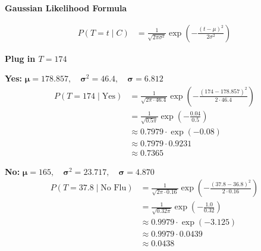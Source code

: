\documentclass[a4paper,12pt]{article}
\begin{document}
\vspace{1cm}

\textbf{Gaussian Likelihood Formula}

\begin{align*}
P(T = t \mid C) &= \frac{1}{\sqrt{2\pi\sigma^2}} \exp\left( -\frac{(t - \mu)^2}{2\sigma^2} \right)
\end{align*}

\textbf{Plug in $T = 174$}

\vspace{1cm}

\textbf{Yes: } $\bm{\mu} = 178.857, \quad \bm{\sigma}^2 = 46.4, \quad \bm{\sigma} = 6.812$
\begin{align*}
P(T = 174 \mid \text{Yes}) &= \frac{1}{\sqrt{2\pi \cdot 46.4}} \exp\left( -\frac{(174 - 178.857)^2}{2 \cdot 46.4} \right) \\
&= \frac{1}{\sqrt{0.5\pi}} \exp\left( -\frac{0.04}{0.5} \right) \\
&\approx 0.7979 \cdot \exp(-0.08) \\
&\approx 0.7979 \cdot 0.9231 \\
&\approx 0.7365
\end{align*}

\textbf{No: } $\bm{\mu} = 165, \quad \bm{\sigma}^2 = 23.717, \quad \bm{\sigma} = 4.870$
\begin{align*}
P(T = 37.8 \mid \text{No Flu}) &= \frac{1}{\sqrt{2\pi \cdot 0.16}} \exp\left( -\frac{(37.8 - 36.8)^2}{2 \cdot 0.16} \right) \\
&= \frac{1}{\sqrt{0.32\pi}} \exp\left( -\frac{1.0}{0.32} \right) \\
&\approx 0.9979 \cdot \exp(-3.125) \\
&\approx 0.9979 \cdot 0.0439 \\
&\approx 0.0438
\end{align*}
\end{document}
